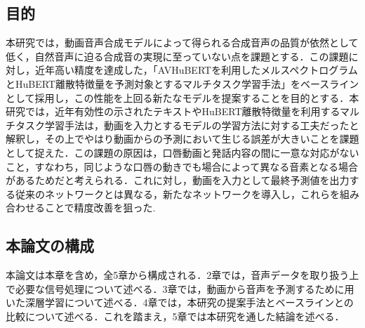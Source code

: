 \subsection{目的}
本研究では，動画音声合成モデルによって得られる合成音声の品質が依然として低く，自然音声に迫る合成音の実現に至っていない点を課題とする．この課題に対し，近年高い精度を達成した，「AVHuBERTを利用したメルスペクトログラムとHuBERT離散特徴量を予測対象とするマルチタスク学習手法」をベースラインとして採用し，この性能を上回る新たなモデルを提案することを目的とする．本研究では，近年有効性の示されたテキストやHuBERT離散特徴量を利用するマルチタスク学習手法は，動画を入力とするモデルの学習方法に対する工夫だったと解釈し，その上でやはり動画からの予測において生じる誤差が大きいことを課題として捉えた．この課題の原因は，口唇動画と発話内容の間に一意な対応がないこと，すなわち，同じような口唇の動きでも場合によって異なる音素となる場合があるためだと考えられる．これに対し，動画を入力として最終予測値を出力する従来のネットワークとは異なる，新たなネットワークを導入し，これらを組み合わせることで精度改善を狙った.

\subsection{本論文の構成}
本論文は本章を含め，全5章から構成される．2章では，音声データを取り扱う上で必要な信号処理について述べる．3章では，動画から音声を予測するために用いた深層学習について述べる．4章では，本研究の提案手法とベースラインとの比較について述べる．これを踏まえ，5章では本研究を通した結論を述べる．

